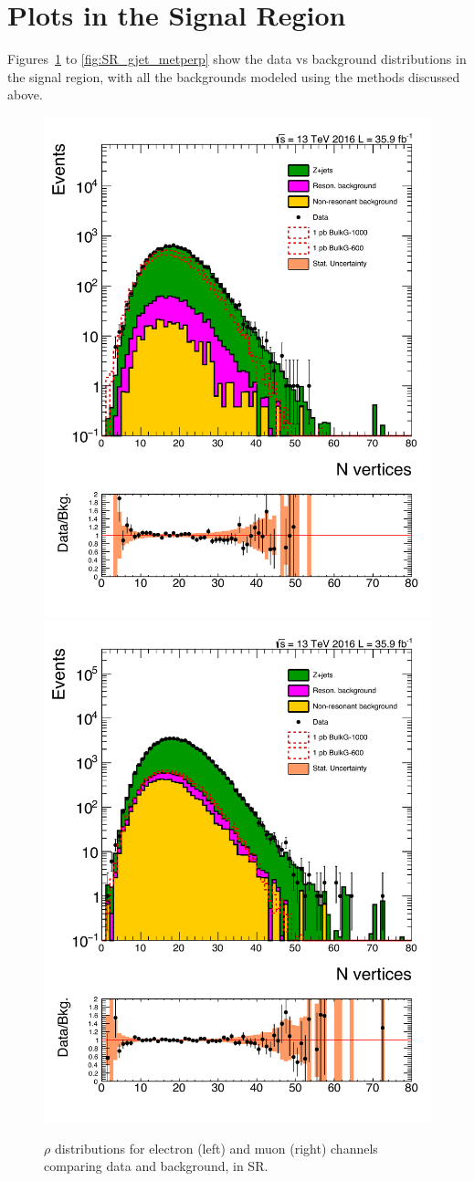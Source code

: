 \section{Plots in the Signal Region}
Figures~\ref{fig:SR_gjet_rho} to \ref{fig:SR_gjet_metperp} show the data vs background distributions in the signal region, with all the backgrounds modeled using the methods discussed above. 
\begin{figure}[htbp!]
\centering
\includegraphics[width=0.46\linewidth, page=1]{figures/ReMiniSummer16_DT_PhReMiniMCRcFixXsec_GMCPhPtWt_SRdPhiGT0p5_puWeightsummer16_muoneg_gjet_metfilter_unblind_el_log_1pb.pdf}
\includegraphics[width=0.46\linewidth, page=1]{figures/ReMiniSummer16_DT_PhReMiniMCRcFixXsec_GMCPhPtWt_SRdPhiGT0p5_puWeightsummer16_muoneg_gjet_metfilter_unblind_mu_log_1pb.pdf}
\caption{$\rho$ distributions for electron (left) and muon (right) channels
comparing data and background, in SR.}
\label{fig:SR_gjet_rho}
\end{figure}


